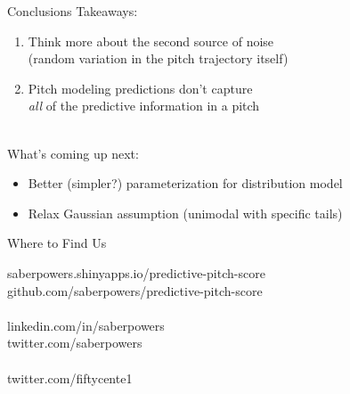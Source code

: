\documentclass{beamer}
\begin{document}
  \begin{frame}{Conclusions}
    Takeaways:
    \begin{enumerate}
      \item Think more about the second source of noise\\
        (random variation in the pitch trajectory itself)
      \item Pitch modeling predictions don't capture\\
        {\it all} of the predictive information in a pitch
    \end{enumerate}
    ~\\
    What's coming up next:
    \begin{itemize}
      \item Better (simpler?) parameterization for distribution model
      \item Relax Gaussian assumption (unimodal with specific tails)
    \end{itemize}
  \end{frame}

  \begin{frame}{Where to Find Us}

    {\color{ricerichblue}saberpowers}{\color{ricegray}.shinyapps.io/}{\color{ricerichblue}predictive-pitch-score}\\
    {\color{ricegray} github.com/}{\color{ricerichblue}saberpowers/predictive-pitch-score}\\
    ~\\
    {\color{ricegray} linkedin.com/in/}{\color{ricerichblue}saberpowers}\\
    {\color{ricegray} twitter.com/}{\color{ricerichblue}saberpowers}\\
    ~\\
    {\color{ricegray} twitter.com/}{\color{ricerichblue}fiftycente1}
  \end{frame}
\end{document}
